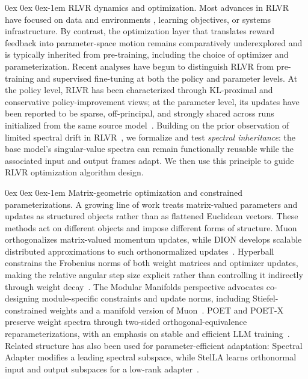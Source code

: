 \documentclass[11pt, a4paper]{utda}
\makeatletter
\renewcommand{\paragraph}{%
  \@startsection{paragraph}{4}%
  {\z@}{0ex \@plus 0ex \@minus 0ex}{-1em}%
  {\normalfont\normalsize\bfseries}%
}
\theoremstyle{plain}
\theoremstyle{definition}
\theoremstyle{remark}
\makeatother
\begin{document}
\paragraph{RLVR dynamics and optimization.}
Most advances in RLVR have focused on data and environments
, learning
objectives, or systems infrastructure.
By contrast, the optimization layer that translates reward feedback into
parameter-space motion remains comparatively underexplored and is typically
inherited from pre-training, including the choice of optimizer and
parameterization.
Recent analyses have begun to distinguish RLVR from pre-training and
supervised fine-tuning at both the policy and parameter levels.
At the policy level, RLVR has been characterized through KL-proximal and
conservative policy-improvement views; at the parameter level, its updates
have been reported to be sparse, off-principal, and strongly shared across
runs initialized from the same source
model~\cite{wu2025invisible,shenfeld2025rl,mukherjee2025reinforcement,zhu2025path}.
Building on the prior observation of limited spectral drift in
RLVR~\cite{zhu2025path}, we formalize and test \emph{spectral inheritance}: the
base model's singular-value spectra can remain functionally reusable while the
associated input and output frames adapt.
We then use this principle to guide RLVR optimization algorithm design.


\paragraph{Matrix-geometric optimization and constrained parameterizations.}
A growing line of work treats matrix-valued parameters and updates as
structured objects rather than as flattened Euclidean vectors. These methods
act on different objects and impose different forms of structure.
Muon orthogonalizes matrix-valued momentum updates, while DION develops
scalable distributed approximations to such orthonormalized
updates~\cite{liu2025muon,ahn2025dion}.
Hyperball constrains the Frobenius norms of both weight matrices and optimizer
updates, making the relative angular step size explicit rather than controlling
it indirectly through weight decay~\cite{wen2025fantastic}.
The Modular Manifolds perspective advocates co-designing module-specific
constraints and update norms, including Stiefel-constrained weights and a
manifold version of Muon~\cite{bernstein2025manifolds}.
POET and POET-X preserve weight spectra through two-sided
orthogonal-equivalence reparameterizations, with an emphasis on stable and
efficient LLM training~\cite{qiu2026reparameterized,qiu2026poet}.
Related structure has also been used for parameter-efficient adaptation:
Spectral Adapter modifies a leading spectral subspace, while StelLA learns
orthonormal input and output subspaces for a low-rank
adapter~\cite{zhang2024spectral,li2026stella}.
\end{document}
